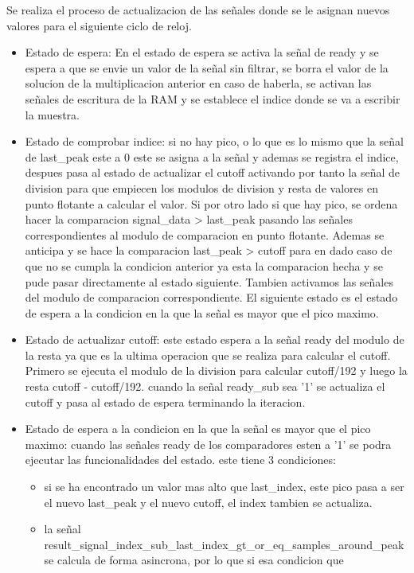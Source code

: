 Se realiza el proceso de actualizacion de las señales donde se le asignan nuevos valores para el siguiente ciclo de reloj.

\begin{itemize}
    \item Estado de espera: En el estado de espera se activa la señal de ready y se espera a que se envie un valor de la
    señal sin filtrar, se borra el valor de la solucion de la multiplicacion anterior en caso de haberla, se activan las
    señales de escritura de la RAM y se establece el indice donde se va a escribir la muestra.
    \item Estado de comprobar indice: si no hay pico, o lo que es lo mismo que la señal de last\_peak este a 0 este se asigna
     a la señal y ademas se registra el indice, despues pasa al estado de actualizar el cutoff activando por tanto la señal de 
     division para que empiecen los modulos de division y resta de valores en punto flotante a calcular el valor. Si por otro
     lado si que hay pico, se ordena hacer la comparacion signal\_data > last\_peak pasando las señales correspondientes al modulo de comparacion en 
     punto flotante. Ademas se anticipa y se hace la comparacion last\_peak > cutoff para en dado caso de que no se cumpla la 
     condicion anterior ya esta la comparacion hecha y se pude pasar directamente al estado siguiente. Tambien activamos las señales
     del modulo de comparacion correspondiente. El siguiente estado es el estado de espera a la condicion en la que la señal es mayor 
     que el pico maximo.
    \item Estado de actualizar cutoff: este estado espera a la señal ready del modulo de la resta ya que es la ultima operacion que se realiza para 
    calcular el cutoff. Primero se ejecuta el modulo de la division para calcular cutoff/192 y luego la resta cutoff - cutoff/192. cuando la señal
    ready\_sub sea '1' se actualiza el cutoff y pasa al estado de espera terminando la iteracion. 
    \item Estado de espera a la condicion en la que la señal es mayor que el pico maximo: cuando las señales ready de los comparadores esten a '1' 
    se podra ejecutar las funcionalidades del estado. este tiene 3 condiciones:
    \begin{itemize}
        \item si se ha encontrado un valor mas alto que last\_index, este pico pasa a ser el nuevo last\_peak y el nuevo cutoff, el index tambien se actualiza. 
        \item la señal result\_signal\_index\_sub\_last\_index\_gt\_or\_eq\_samples\_around\_peak se calcula de forma asincrona, por lo que si esa condicion que

\end{itemize}
\end{itemize}
